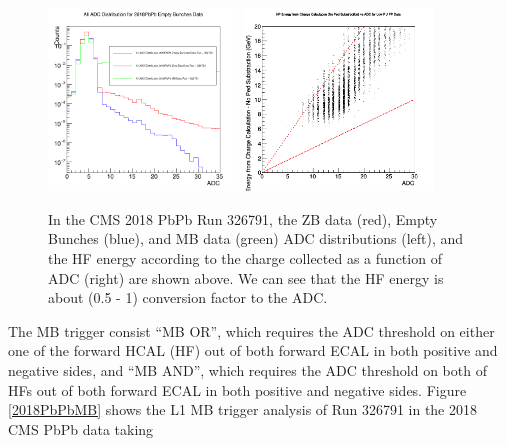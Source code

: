 \begin{figure}[hbtp]
\begin{center}
\includegraphics[width=0.45\textwidth]{Figures/Chapter3/AllADC.png}
\includegraphics[width=0.45\textwidth]{Figures/Chapter3/HFvsADC.png}
\caption{In the CMS 2018 PbPb Run 326791, the ZB data (red), Empty Bunches (blue), and MB data (green) ADC distributions (left), and the HF energy according to the charge collected as a function of ADC (right) are shown above. We can see that the HF energy  is about (0.5 - 1) conversion factor to the ADC.}
\label{HFADC}
\end{center}
\end{figure} 

The MB trigger consist ``MB OR'', which requires the ADC threshold on either one of the forward HCAL (HF) out of both forward ECAL in both positive and negative sides, and ``MB AND'',  which requires the ADC threshold on both of HFs out of both forward ECAL in both positive and negative sides. Figure \ref{2018PbPbMB} shows the L1 MB trigger analysis of Run 326791 in the 2018 CMS PbPb data taking 

